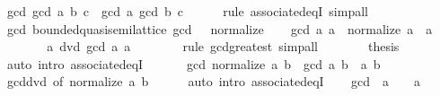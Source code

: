 \begin{isabellebody}
\ {\isachardoublequoteopen}gcd\ {\isacharparenleft}{\kern0pt}gcd\ a\ b{\isacharparenright}{\kern0pt}\ c\ {\isacharequal}{\kern0pt}\ gcd\ a\ {\isacharparenleft}{\kern0pt}gcd\ b\ c{\isacharparenright}{\kern0pt}{\isachardoublequoteclose}\isanewline
\ \ \ \ \isamarkupfalse%
\ {\isacharparenleft}{\kern0pt}rule\ associated{\isacharunderscore}{\kern0pt}eqI{\isacharparenright}{\kern0pt}\ simp{\isacharunderscore}{\kern0pt}all\isanewline
{}\isamarkupfalse%
%
\endisatagproof
{\isafoldproof}%
%
\isadelimproof
\isanewline
%
\endisadelimproof
\isanewline
{}\isamarkupfalse%
\ gcd{\isacharcolon}{\kern0pt}\ bounded{\isacharunderscore}{\kern0pt}quasi{\isacharunderscore}{\kern0pt}semilattice\ gcd\ {}\ {}\ normalize\isanewline
%
\isadelimproof
%
\endisadelimproof
%
\isatagproof
{}\isamarkupfalse%
\isanewline
\ \ \isamarkupfalse%
\ {\isachardoublequoteopen}gcd\ a\ a\ {\isacharequal}{\kern0pt}\ normalize\ a{\isachardoublequoteclose}\ \ a\isanewline
\ \ \isamarkupfalse%
\ {\isacharminus}{\kern0pt}\isanewline
\ \ \ \ \isamarkupfalse%
\ {\isachardoublequoteopen}a\ dvd\ gcd\ a\ a{\isachardoublequoteclose}\isanewline
\ \ \ \ \ \ \isamarkupfalse%
\ {\isacharparenleft}{\kern0pt}rule\ gcd{\isacharunderscore}{\kern0pt}greatest{\isacharparenright}{\kern0pt}\ simp{\isacharunderscore}{\kern0pt}all\isanewline
\ \ \ \ \isamarkupfalse%
\ \isamarkupfalse%
\ {\isacharquery}{\kern0pt}thesis\isanewline
\ \ \ \ \ \ \isamarkupfalse%
\ {\isacharparenleft}{\kern0pt}auto\ intro{\isacharcolon}{\kern0pt}\ associated{\isacharunderscore}{\kern0pt}eqI{\isacharparenright}{\kern0pt}\isanewline
\ \ \isamarkupfalse%
\isanewline
\ \ \isamarkupfalse%
\ {\isachardoublequoteopen}gcd\ {\isacharparenleft}{\kern0pt}normalize\ a{\isacharparenright}{\kern0pt}\ b\ {\isacharequal}{\kern0pt}\ gcd\ a\ b{\isachardoublequoteclose}\ \ a\ b\isanewline
\ \ \ \ \isamarkupfalse%
\ gcd{\isacharunderscore}{\kern0pt}dvd{}\ {\isacharbrackleft}{\kern0pt}of\ {\isachardoublequoteopen}normalize\ a{\isachardoublequoteclose}\ b{\isacharbrackright}{\kern0pt}\isanewline
\ \ \ \ \isamarkupfalse%
\ {\isacharparenleft}{\kern0pt}auto\ intro{\isacharcolon}{\kern0pt}\ associated{\isacharunderscore}{\kern0pt}eqI{\isacharparenright}{\kern0pt}\isanewline
\ \ \isamarkupfalse%
\ {\isachardoublequoteopen}gcd\ {}\ a\ {\isacharequal}{\kern0pt}\ {}{\isachardoublequoteclose}\ \ a\isanewline

\end{isabellebody}
